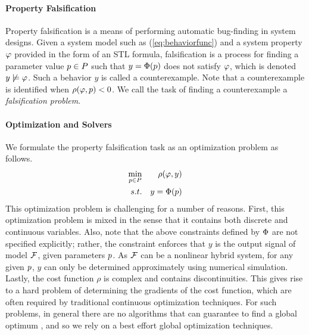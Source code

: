 \paragraph{Property Falsification}	

Property falsification is a means of performing automatic bug-finding in system designs.
Given a system model such as (\ref{eq:behaviorfunc}) and a system property $\varphi$ provided in the form of an STL formula, 
falsification is a process for finding a parameter value $p \in P$
such that $y=\Phi(p)$ does not satisfy $\varphi$, which is denoted $y
\not\models \varphi$. Such a behavior $y$ is called a counterexample. 
Note that a counterexample is identified when 
$\rho(\varphi,p)<0$. We call the task of finding a counterexample 
a {\em falsification problem}. 

\paragraph{Optimization and Solvers}	

We formulate the property falsification task as an optimization problem as follows.
\begin{eqnarray} \label{eq:optim1}
\min_{p \in P} && \rho(\varphi,y) \\ \nonumber
s.t. && y=\Phi(p)
\end{eqnarray}
This optimization problem is challenging for a number of reasons. First, this optimization problem is mixed in the sense that it contains both discrete and continuous variables. Also, note that the above constraints defined by $\Phi$ 
are not specified explicitly; rather, the constraint enforces that $y$ is the output signal of model $\mathcal{F}$, given parameters $p$.
As $\mathcal{F}$ can be a nonlinear hybrid system, for any given $p$, $y$ can only be determined approximately using numerical simulation. 
Lastly, the cost function $\rho$ is complex and contains discontinuities.
This gives rise to a hard problem of determining the gradients of the cost function, which are often required by traditional continuous optimization techniques. 
For such problems, in general there are no algorithms that can guarantee to find a global optimum \cite{FloudasPardalos2009}, and so we rely on a best effort global optimization techniques. 

